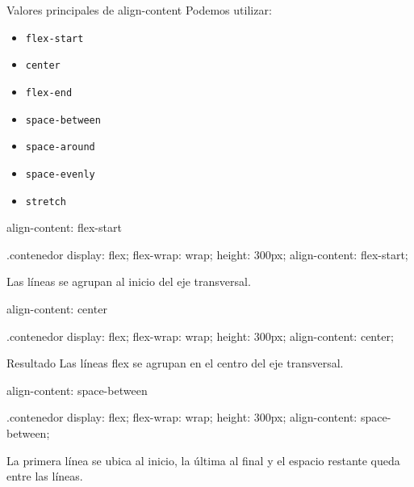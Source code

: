 \documentclass[aspectratio=169,11.5pt]{beamer}
\begin{document}
    \begin{frame}{Valores principales de align-content}
        Podemos utilizar:

        \begin{itemize}
            \item \texttt{flex-start}
            \item \texttt{center}
            \item \texttt{flex-end}
            \item \texttt{space-between}
            \item \texttt{space-around}
            \item \texttt{space-evenly}
            \item \texttt{stretch}
        \end{itemize}
    \end{frame}

    \begin{frame}[fragile]{align-content: flex-start}
        \begin{csscodedark}
            .contenedor {
                display: flex;
                flex-wrap: wrap;
                height: 300px;
                align-content: flex-start;
            }
        \end{csscodedark}

        Las líneas se agrupan al inicio
        del eje transversal.
    \end{frame}

    \begin{frame}[fragile]{align-content: center}
        \begin{csscodedark}
            .contenedor {
                display: flex;
                flex-wrap: wrap;
                height: 300px;
                align-content: center;
            }
        \end{csscodedark}

        \begin{block}{Resultado}
            Las líneas flex se agrupan en el centro
            del eje transversal.
        \end{block}
    \end{frame}

    \begin{frame}[fragile]{align-content: space-between}
        \begin{csscodedark}
            .contenedor {
                display: flex;
                flex-wrap: wrap;
                height: 300px;
                align-content: space-between;
            }
        \end{csscodedark}

        La primera línea se ubica al inicio,
        la última al final y el espacio restante
        queda entre las líneas.
    \end{frame}
\end{document}
